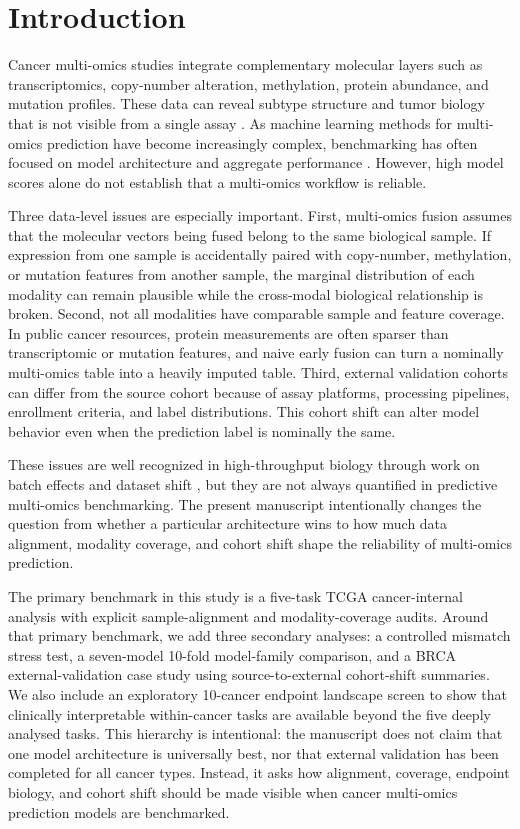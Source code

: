 \section{Introduction}

Cancer multi-omics studies integrate complementary molecular layers such as transcriptomics, copy-number alteration, methylation, protein abundance, and mutation profiles. These data can reveal subtype structure and tumor biology that is not visible from a single assay \cite{tcga_brca_2012,hoadley_pancancer_2018}. As machine learning methods for multi-omics prediction have become increasingly complex, benchmarking has often focused on model architecture and aggregate performance \cite{wang_mogonet_2021,leng_benchmark_2022}. However, high model scores alone do not establish that a multi-omics workflow is reliable.

Three data-level issues are especially important. First, multi-omics fusion assumes that the molecular vectors being fused belong to the same biological sample. If expression from one sample is accidentally paired with copy-number, methylation, or mutation features from another sample, the marginal distribution of each modality can remain plausible while the cross-modal biological relationship is broken. Second, not all modalities have comparable sample and feature coverage. In public cancer resources, protein measurements are often sparser than transcriptomic or mutation features, and naive early fusion can turn a nominally multi-omics table into a heavily imputed table. Third, external validation cohorts can differ from the source cohort because of assay platforms, processing pipelines, enrollment criteria, and label distributions. This cohort shift can alter model behavior even when the prediction label is nominally the same.

These issues are well recognized in high-throughput biology through work on batch effects and dataset shift \cite{johnson_combat_2007,leek_batch_2010,quionero_dataset_shift_2009}, but they are not always quantified in predictive multi-omics benchmarking. The present manuscript intentionally changes the question from whether a particular architecture wins to how much data alignment, modality coverage, and cohort shift shape the reliability of multi-omics prediction.

The primary benchmark in this study is a five-task TCGA cancer-internal analysis with explicit sample-alignment and modality-coverage audits. Around that primary benchmark, we add three secondary analyses: a controlled mismatch stress test, a seven-model 10-fold model-family comparison, and a BRCA external-validation case study using source-to-external cohort-shift summaries. We also include an exploratory 10-cancer endpoint landscape screen to show that clinically interpretable within-cancer tasks are available beyond the five deeply analysed tasks. This hierarchy is intentional: the manuscript does not claim that one model architecture is universally best, nor that external validation has been completed for all cancer types. Instead, it asks how alignment, coverage, endpoint biology, and cohort shift should be made visible when cancer multi-omics prediction models are benchmarked.
